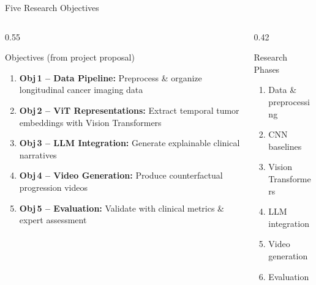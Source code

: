 \documentclass[aspectratio=169,xcolor=dvipsnames]{beamer}
\begin{document}
\begin{frame}{Five Research Objectives}
    \begin{columns}
        \begin{column}{0.55\textwidth}
            \begin{block}{ Objectives (from project proposal)}
                \small
                \begin{enumerate}
                    \item \textbf{Obj\,1 -- Data Pipeline:} Preprocess \& organize longitudinal cancer imaging data

                    \vspace{0.2em}
                    \item \textbf{Obj\,2 -- ViT Representations:} Extract temporal tumor embeddings with Vision Transformers

                    \vspace{0.2em}
                    \item \textbf{Obj\,3 -- LLM Integration:} Generate explainable clinical narratives

                    \vspace{0.2em}
                    \item \textbf{Obj\,4 -- Video Generation:} Produce counterfactual progression videos

                    \vspace{0.2em}
                    \item \textbf{Obj\,5 -- Evaluation:} Validate with clinical metrics \& expert assessment
                \end{enumerate}
            \end{block}
        \end{column}

        \begin{column}{0.42\textwidth}
            \begin{block}{ Research Phases}
                \small
                \begin{enumerate}
                    \item Data \& preprocessing
                    \item CNN baselines
                    \item Vision Transformers
                    \item LLM integration
                    \item Video generation
                    \item Evaluation
                \end{enumerate}
            \end{block}


\end{column}
\end{columns}
\end{frame}
\end{document}
